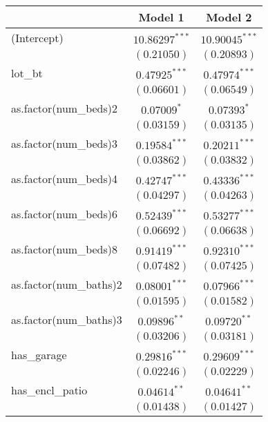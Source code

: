 
\begin{table}
\begin{center}
\begin{tabular}{l c c}
\hline
 & Model 1 & Model 2 \\
\hline
(Intercept)                & $10.86297^{***}$ & $10.90045^{***}$ \\
                           & $(0.21050)$      & $(0.20893)$      \\
lot\_bt                    & $0.47925^{***}$  & $0.47974^{***}$  \\
                           & $(0.06601)$      & $(0.06549)$      \\
as.factor(num\_beds)2      & $0.07009^{*}$    & $0.07393^{*}$    \\
                           & $(0.03159)$      & $(0.03135)$      \\
as.factor(num\_beds)3      & $0.19584^{***}$  & $0.20211^{***}$  \\
                           & $(0.03862)$      & $(0.03832)$      \\
as.factor(num\_beds)4      & $0.42747^{***}$  & $0.43336^{***}$  \\
                           & $(0.04297)$      & $(0.04263)$      \\
as.factor(num\_beds)6      & $0.52439^{***}$  & $0.53277^{***}$  \\
                           & $(0.06692)$      & $(0.06638)$      \\
as.factor(num\_beds)8      & $0.91419^{***}$  & $0.92310^{***}$  \\
                           & $(0.07482)$      & $(0.07425)$      \\
as.factor(num\_baths)2     & $0.08001^{***}$  & $0.07966^{***}$  \\
                           & $(0.01595)$      & $(0.01582)$      \\
as.factor(num\_baths)3     & $0.09896^{**}$   & $0.09720^{**}$   \\
                           & $(0.03206)$      & $(0.03181)$      \\
has\_garage                & $0.29816^{***}$  & $0.29609^{***}$  \\
                           & $(0.02246)$      & $(0.02229)$      \\
has\_encl\_patio           & $0.04614^{**}$   & $0.04641^{**}$   \\
                           & $(0.01438)$      & $(0.01427)$      \\

\end{tabular}
\end{center}
\end{table}
